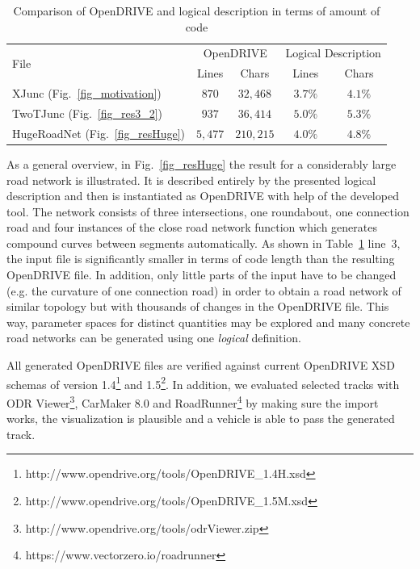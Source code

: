 \documentclass[a4paper, 10pt, conference]{ieeeconf}      %
\begin{document}
\begin{table}[h]
	\caption{Comparison of OpenDRIVE and logical description in terms of amount of code}
	\label{tab_comparison}
	\def\arraystretch{1.5}
	\begin{center}
		\begin{tabular}{l|cccc}
			\multirow{2}{*}{File} & \multicolumn{2}{c}{OpenDRIVE} & \multicolumn{2}{c}{Logical Description}\\
			& Lines & Chars & Lines & Chars \\
			\hline
			XJunc (Fig.~\ref{fig_motivation}) & $870$ & $32,468$& $3.7\%$ &$4.1\%$\\
			TwoTJunc (Fig.~\ref{fig_res3_2}) & $937$ & $36,414$& $5.0\%$ &$5.3\%$\\
			HugeRoadNet (Fig.~\ref{fig_resHuge}) & $5,477$ & $210,215$& $4.0\%$ &$4.8\%$
		\end{tabular}
	\end{center}
\end{table}

\addtolength{\textheight}{-10.8cm}   %
As a general overview, in Fig.~\ref{fig_resHuge} the result for a considerably large road network is illustrated. It is described entirely by the presented logical description and then is instantiated as OpenDRIVE with help of the developed tool. The network consists of three intersections, one roundabout, one connection road and four instances of the close road network function which generates compound curves between segments automatically. As shown in Table~\ref{tab_comparison} line~3, the input file is significantly smaller in terms of code length than the resulting OpenDRIVE file. In addition, only little parts of the input have to be changed (e.g. the curvature of one connection road) in order to obtain a road network of similar topology but with thousands of changes in the OpenDRIVE file. This way, parameter spaces for distinct quantities may be explored and many concrete road networks can be generated using one \emph{logical} definition.

All generated OpenDRIVE files are verified against current OpenDRIVE XSD schemas of version 1.4\footnote{http://www.opendrive.org/tools/OpenDRIVE\_1.4H.xsd} and 1.5\footnote{http://www.opendrive.org/tools/OpenDRIVE\_1.5M.xsd}. In addition, we evaluated selected tracks with ODR Viewer\footnote{http://www.opendrive.org/tools/odrViewer.zip}, CarMaker 8.0 and RoadRunner\footnote{https://www.vectorzero.io/roadrunner} by making sure the import works, the visualization is plausible and a vehicle is able to pass the generated track.
\end{document}
